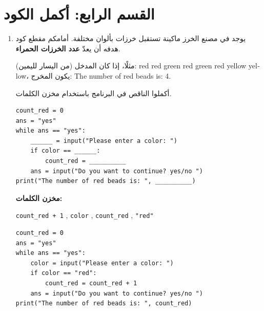 \documentclass[14pt]{extarticle}
\begin{document}
\clearpage

\section*{القسم الرابع: أكمل الكود}

\begin{enumerate}[itemsep=3em]


\item يوجد في مصنع الخرز ماكينة تستقبل خرزات بألوان مختلفة. أمامكم مقطع كود هدفه أن يعدّ \textbf{عدد الخرزات الحمراء}.

مثلًا، إذا كان المدخل (من اليسار لليمين): \textenglish{red red green red green red yellow yellow}، يكون المخرج: \textenglish{The number of red beads is: 4}.

أكملوا الناقص في البرنامج باستخدام مخزن الكلمات.

\begin{boxCode}
\begin{english}
\begin{verbatim}
count_red = 0
ans = "yes"
while ans == "yes":
    ______ = input("Please enter a color: ")
    if color == ______:
        count_red = __________
    ans = input("Do you want to continue? yes/no ")
print("The number of red beads is: ", __________)
\end{verbatim}
\end{english}
\end{boxCode}

\textbf{مخزن الكلمات:}
\begin{center}
\begin{english}
\begin{boxCode}
\texttt{count\_red + 1} \quad , \quad \texttt{color} \quad , \quad \texttt{count\_red} \quad , \quad \texttt{"red"}
\end{boxCode}
\end{english}
\end{center}

\ifwithsols
\begin{boxSolution}
\begin{english}
\begin{verbatim}
count_red = 0
ans = "yes"
while ans == "yes":
    color = input("Please enter a color: ")
    if color == "red":
        count_red = count_red + 1
    ans = input("Do you want to continue? yes/no ")
print("The number of red beads is: ", count_red)
\end{verbatim}
\end{english}
\end{boxSolution}
\fi


\end{enumerate}
\end{document}
